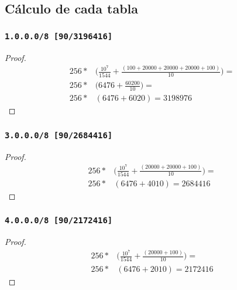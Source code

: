 \documentclass[12pt, times]{simauth}
\begin{document}
\subsection{Cálculo de cada tabla}
\begin{minipage}[t]{0.45\linewidth}
\subsubsection{\texttt{1.0.0.0/8 [90/3196416]}}
\begin{proof}
    \begin{align*}
        256 *& \bigg(\frac{10^7}{1544} + \frac{(100 + 20000 + 20000 + 20000 + 100)}{10}\bigg) = \\
        256 *& \bigg(6476 + \frac{60200}{10} \bigg) = \\
        256 *& (6476 + 6020) = 3198976
    \end{align*}
\end{proof}
\subsubsection{\texttt{3.0.0.0/8 [90/2684416]}}
\begin{proof}
    \begin{align*}
        256 *& \bigg(\frac{10^7}{1544} + \frac{(20000 + 20000 + 100)}{10}\bigg) = \\
        256 *& (6476 + 4010) = 2684416
    \end{align*}
\end{proof}
\subsubsection{\texttt{4.0.0.0/8 [90/2172416]}}
\begin{proof}
    \begin{align*}
        256 *& \bigg(\frac{10^7}{1544} + \frac{(20000 + 100)}{10}\bigg) = \\
        256 *& (6476 + 2010) = 2172416
    \end{align*}
\end{proof}
\end{minipage} \hfill
\end{document}
